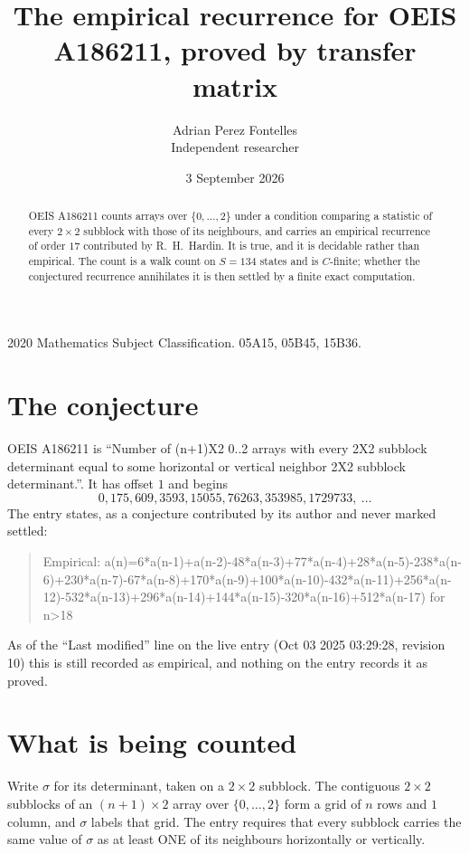 \documentclass[11pt,a4paper]{article}
\title{The empirical recurrence for OEIS A186211, proved by transfer matrix}
\author{Adrian Perez Fontelles\\ \small Independent researcher}
\date{3 September 2026}
\theoremstyle{plain}
\theoremstyle{definition}
\begin{document}
\maketitle

\begin{abstract}
OEIS A186211 counts arrays over $\{0,\dots,2\}$ under a condition comparing a statistic of
every $2\times2$ subblock with those of its neighbours, and carries an empirical recurrence
of order $17$ contributed by R.~H.~Hardin. It is true, and it is decidable rather than
empirical. The count is a walk count on $S=134$ states and is $C$-finite; whether the
conjectured recurrence annihilates it is then settled by a finite exact computation.
\end{abstract}

\noindent\small 2020 Mathematics Subject Classification. 05A15, 05B45, 15B36.\normalsize

\section{The conjecture}

OEIS A186211 is ``Number of (n+1)X2 0..2 arrays with every 2X2 subblock determinant equal to some horizontal or vertical neighbor 2X2 subblock determinant.''. It has offset $1$ and begins
\[
0, 175, 609, 3593, 15055, 76263, 353985, 1729733,\ \dots
\]
The entry states, as a conjecture contributed by its author and never marked settled:
\begin{quote}
Empirical: a(n)=6*a(n-1)+a(n-2)-48*a(n-3)+77*a(n-4)+28*a(n-5)-238*a(n-6)+230*a(n-7)-67*a(n-8)+170*a(n-9)+100*a(n-10)-432*a(n-11)+256*a(n-12)-532*a(n-13)+296*a(n-14)+144*a(n-15)-320*a(n-16)+512*a(n-17) for n>18
\end{quote}
As of the ``Last modified'' line on the live entry (Oct 03 2025 03:29:28, revision 10) this is still
recorded as empirical, and nothing on the entry records it as proved.

\section{What is being counted}

Write $\sigma$ for its determinant, taken on a $2\times2$ subblock. The contiguous $2\times2$
subblocks of an $(n+1)\times2$ array over $\{0,\dots,2\}$ form a grid of $n$ rows
and $1$ column, and $\sigma$ labels that grid. The entry
requires that every subblock carries the same value of $\sigma$ as at least ONE of its neighbours horizontally or vertically.
\end{document}
